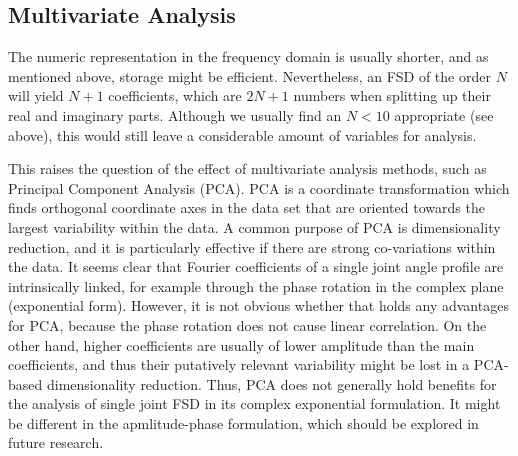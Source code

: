\subsection{Multivariate Analysis}
\label{sec:org8b03db5}
The numeric representation in the frequency domain is usually shorter, and as mentioned above, storage might be efficient.
Nevertheless, an FSD of the order \(N\) will yield \(N+1\) coefficients, which are \(2N+1\) numbers when splitting up their real and imaginary parts.
Although we usually find an \(N<10\) appropriate (see above), this would still leave a considerable amount of variables for analysis.

This raises the question of the effect of multivariate analysis methods, such as Principal Component Analysis (PCA).
PCA is a coordinate transformation which finds orthogonal coordinate axes in the data set that are oriented towards the largest variability within the data.
A common purpose of PCA is dimensionality reduction, and it is particularly effective if there are strong co-variations within the data.
It seems clear that Fourier coefficients of a single joint angle profile are intrinsically linked, for example through the phase rotation in the complex plane (exponential form).
However, it is not obvious whether that holds any advantages for PCA, because the phase rotation does not cause linear correlation.
On the other hand, higher coefficients are usually of lower amplitude than the main coefficients, and thus their putatively relevant variability might be lost in a PCA-based dimensionality reduction.
Thus, PCA does not generally hold benefits for the analysis of single joint FSD in its complex exponential formulation.
It might be different in the apmlitude-phase formulation, which should be explored in future research.


